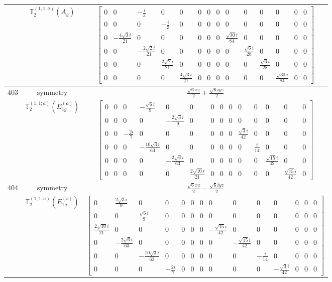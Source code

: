 \documentclass[fleqn,8pt,landscape]{jsarticle}
\begin{document}
\begin{longtable}{ccc}
$  $ & $ \mathbb{T}_{2}^{(1,1;a)}(A_{g}) $ & $ \begin{bmatrix} 0 & 0 & - \frac{i}{3} & 0 & 0 & 0 & 0 & 0 & 0 & 0 & 0 & 0 & 0 & 0 \\ 0 & 0 & 0 & - \frac{i}{3} & 0 & 0 & 0 & 0 & 0 & 0 & 0 & 0 & 0 & 0 \\ 0 & - \frac{4 \sqrt{3} i}{21} & 0 & 0 & 0 & 0 & 0 & 0 & \frac{\sqrt{30} i}{84} & 0 & 0 & 0 & 0 & 0 \\ 0 & 0 & - \frac{2 \sqrt{2} i}{21} & 0 & 0 & 0 & 0 & 0 & 0 & \frac{\sqrt{6} i}{28} & 0 & 0 & 0 & 0 \\ 0 & 0 & 0 & \frac{2 \sqrt{2} i}{21} & 0 & 0 & 0 & 0 & 0 & 0 & \frac{\sqrt{6} i}{28} & 0 & 0 & 0 \\ 0 & 0 & 0 & 0 & \frac{4 \sqrt{3} i}{21} & 0 & 0 & 0 & 0 & 0 & 0 & \frac{\sqrt{30} i}{84} & 0 & 0 \end{bmatrix} $ \\ \hline
$ 403 $ & $ \text{symmetry} $ & $ \frac{\sqrt{6} x z}{2} + \frac{\sqrt{6} i y z}{2} $ \\
$  $ & $ \mathbb{T}_{2}^{(1,1;a)}(E_{1g}^{(a)}) $ & $ \begin{bmatrix} 0 & 0 & 0 & - \frac{\sqrt{6} i}{9} & 0 & 0 & 0 & 0 & 0 & 0 & 0 & 0 & 0 & 0 \\ 0 & 0 & 0 & 0 & - \frac{2 \sqrt{3} i}{9} & 0 & 0 & 0 & 0 & 0 & 0 & 0 & 0 & 0 \\ 0 & 0 & - \frac{2 i}{7} & 0 & 0 & 0 & 0 & 0 & 0 & \frac{\sqrt{3} i}{42} & 0 & 0 & 0 & 0 \\ 0 & 0 & 0 & - \frac{10 \sqrt{3} i}{63} & 0 & 0 & 0 & 0 & 0 & 0 & \frac{i}{14} & 0 & 0 & 0 \\ 0 & 0 & 0 & 0 & - \frac{2 \sqrt{6} i}{63} & 0 & 0 & 0 & 0 & 0 & 0 & \frac{\sqrt{15} i}{42} & 0 & 0 \\ 0 & 0 & 0 & 0 & 0 & \frac{2 \sqrt{10} i}{21} & 0 & 0 & 0 & 0 & 0 & 0 & \frac{\sqrt{15} i}{42} & 0 \end{bmatrix} $ \\ \hline
$ 404 $ & $ \text{symmetry} $ & $ \frac{\sqrt{6} x z}{2} - \frac{\sqrt{6} i y z}{2} $ \\
$  $ & $ \mathbb{T}_{2}^{(1,1;a)}(E_{1g}^{(b)}) $ & $ \begin{bmatrix} 0 & \frac{2 \sqrt{3} i}{9} & 0 & 0 & 0 & 0 & 0 & 0 & 0 & 0 & 0 & 0 & 0 & 0 \\ 0 & 0 & \frac{\sqrt{6} i}{9} & 0 & 0 & 0 & 0 & 0 & 0 & 0 & 0 & 0 & 0 & 0 \\ \frac{2 \sqrt{10} i}{21} & 0 & 0 & 0 & 0 & 0 & 0 & - \frac{\sqrt{15} i}{42} & 0 & 0 & 0 & 0 & 0 & 0 \\ 0 & - \frac{2 \sqrt{6} i}{63} & 0 & 0 & 0 & 0 & 0 & 0 & - \frac{\sqrt{15} i}{42} & 0 & 0 & 0 & 0 & 0 \\ 0 & 0 & - \frac{10 \sqrt{3} i}{63} & 0 & 0 & 0 & 0 & 0 & 0 & - \frac{i}{14} & 0 & 0 & 0 & 0 \\ 0 & 0 & 0 & - \frac{2 i}{7} & 0 & 0 & 0 & 0 & 0 & 0 & - \frac{\sqrt{3} i}{42} & 0 & 0 & 0 \end{bmatrix} $ \\ \hline

\end{longtable}
\end{document}

